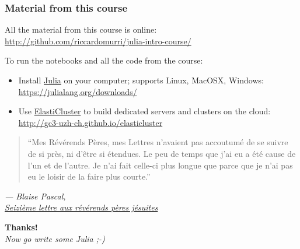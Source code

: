 \documentclass[english,serif,mathserif,xcolor=pdftex,dvipsnames,table]{beamer}
\begin{document}
\begin{frame}
  \frametitle{Material from this course}
  \small
  All the material from this course is online:
  \url{http://github.com/riccardomurri/julia-intro-course/}

  \+
  To run the notebooks and all the code from the course:
  \begin{itemize}
  \item Install \href{https://julialang.org/downloads/}{Julia}
    on your computer; supports Linux,
    MacOSX, Windows: \url{https://julialang.org/downloads/}
  \item Use
    \href{http://gc3-uzh-ch.github.io/elasticluster}{ElastiCluster} to
    build dedicated servers and clusters on the cloud:
    \url{http://gc3-uzh-ch.github.io/elasticluster}
  \end{itemize}
\end{frame}




\begin{frame}
  \begin{quote}
    ``Mes Révérends Pères, mes Lettres n'avaient pas accoutumé de se suivre de
    si près, ni d'être si étendues. Le peu de temps que j'ai eu a été cause de
    l'un et de l'autre. Je n'ai fait celle-ci plus longue que parce que je n'ai
    pas eu le loisir de la faire plus courte.''
  \end{quote}

  \+
  \begin{flushright}
    \small\em
    --- Blaise Pascal, \\
    \href{https://www.ebooksgratuits.com/ebooksfrance/pascal_les_provinciales.pdf}{Seizième
      lettre aux révérends pères jésuites}
  \end{flushright}
\end{frame}


\begin{frame}
  \begin{center}
    {\Huge\bfseries Thanks!}
    \\[2em]
    {\large\itshape\color{gray} Now go write some Julia ;-)}
  \end{center}
\end{frame}
\end{document}
